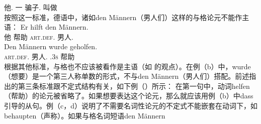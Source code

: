      他.\nom{} \passivepst{} 一 骗子.\nom{} 叫做\\
\zl
按照这一标准，德语中，诸如den Männern（男人们）这样的与格论元不能作主语：
\eal
\ex 
\gll Er hilft den Männern.\\
	 他 帮助 \textsc{art}.\textsc{def}.\dat{} 男人.\dat{}\\
\ex
\label{bsp-den-maennern-wurde-geholfen}
\gll Den Männern wurde geholfen.\\
     \textsc{art}.\textsc{def}.\dat{} 男人.\dat{} \passivepst.3\textsc{s} 帮助\\
\zl
根据其他标准，与格也不应该被看作是主语（如 \citet{Reis82}的观点）。在例（b）中，wurde（想要）是一个第三人称单数的形式，不与den Männern（男人们）搭配。前述指出的第三条标准跟不定式结构有关，如下例（）所示：
\eal
{}
\zl
%
在第一句中，动词helfen（帮助）的论元被省略了。如果想要表达这个论元，那么就应该用例（b）中dass引导的从句。例（c，d）说明了不需要名词性论元的不定式不能嵌套在动词下，如behaupten（声称）。如果与格名词短语den Männern
